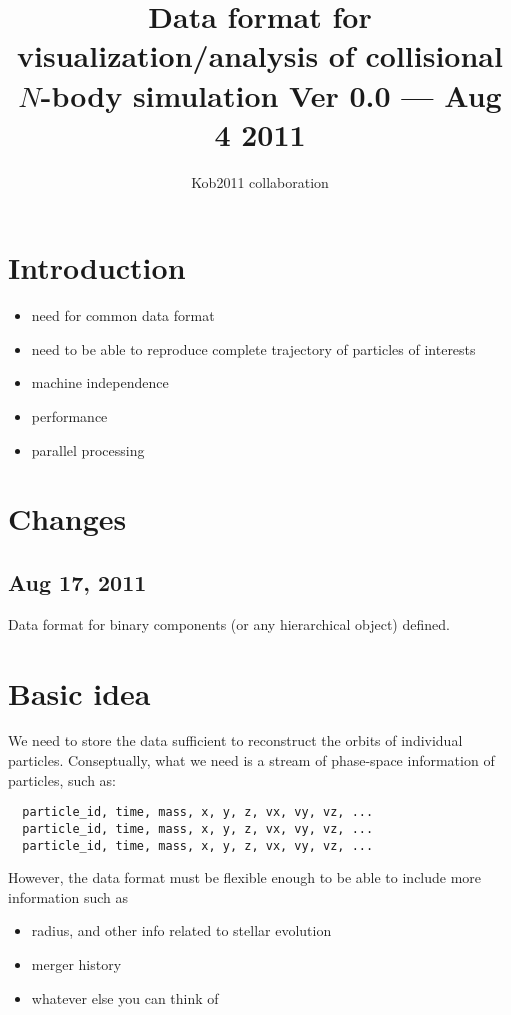 \documentclass[12pt]{article}
\begin{document}
\def\bx{{\bf x}}
\def\bv{{\bf v}}
\def\ba{{\bf a}}
\def\badot{{\bf \dot{a}}}
\def\batwodot{{\bf a}^{(2)}}
\def\bathreedot{{\bf a}^{(3)}}
\def\bj{{\bf j}}
\def\dt{{\Delta t}}
\def\comment#1{}
\def\sub#1{_{\rm #1}}
\def\sup#1{^{\rm #1}}
\def\APJ{{\it Ap. J. }}
\def\APJL{{\it Ap. J. Lett. }}


\title{Data format for visualization/analysis of collisional $N$-body simulation
{\large 
Ver 0.0 --- Aug 4 2011
}
}
\author{Kob2011 collaboration}
\maketitle

\tableofcontents

\newpage

\thispagestyle{empty}




\section{Introduction}

\begin{itemize}

  \item need for common data format
  \item need to be able to reproduce complete trajectory of particles
    of interests
  \item machine independence
  \item performance
  \item parallel processing
\end{itemize}

\section{Changes}
\subsection{Aug 17, 2011}

Data format for binary components (or any hierarchical object)
defined.


\section{Basic idea}

We need to store the data sufficient to reconstruct the orbits of
individual particles. Conseptually, what we need is a stream of
phase-space information of particles, such as:
\begin{verbatim}
  particle_id, time, mass, x, y, z, vx, vy, vz, ...
  particle_id, time, mass, x, y, z, vx, vy, vz, ...
  particle_id, time, mass, x, y, z, vx, vy, vz, ...
\end{verbatim}
However, the data format must be flexible enough to be able to include
more information such as
\begin{itemize}
  \item radius, and other info related to stellar evolution
  \item merger history
  \item whatever else you can think of
\end{itemize}
\end{document}
